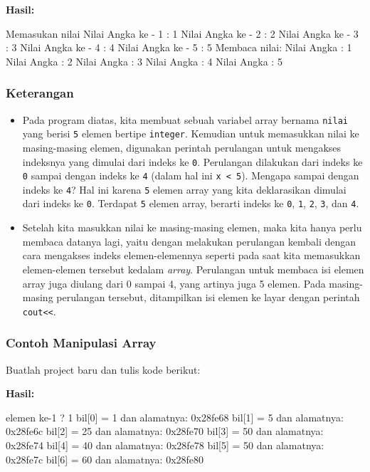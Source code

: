 \textbf{Hasil:}
\begin{lcverbatim}
Memasukan nilai
Nilai Angka ke - 1 : 1
Nilai Angka ke - 2 : 2
Nilai Angka ke - 3 : 3
Nilai Angka ke - 4 : 4
Nilai Angka ke - 5 : 5
Membaca nilai:
Nilai Angka : 1
Nilai Angka : 2
Nilai Angka : 3
Nilai Angka : 4
Nilai Angka : 5
\end{lcverbatim}

\subsubsection*{Keterangan}

\begin{itemize}
\item
 Pada program diatas, kita membuat sebuah variabel array bernama
 \texttt{nilai} yang berisi \texttt{5} elemen bertipe \texttt{integer}.
 Kemudian untuk memasukkan nilai ke masing-masing elemen, digunakan
 perintah perulangan untuk mengakses indeksnya yang dimulai dari indeks
 ke \texttt{0}. Perulangan dilakukan dari indeks ke \texttt{0} sampai
 dengan indeks ke \texttt{4} (dalam hal ini
 \texttt{x\ \textless{}\ 5}). Mengapa sampai dengan indeks ke
 \texttt{4}? Hal ini karena \texttt{5} elemen array yang kita
 deklarasikan dimulai dari indeks ke \texttt{0}. Terdapat \texttt{5}
 elemen array, berarti indeks ke \texttt{0}, \texttt{1}, \texttt{2},
 \texttt{3}, dan \texttt{4}.
\item
 Setelah kita masukkan nilai ke masing-masing elemen, maka kita hanya
 perlu membaca datanya lagi, yaitu dengan melakukan perulangan kembali
 dengan cara mengakses indeks elemen-elemennya seperti pada saat kita
 memasukkan elemen-elemen tersebut kedalam \emph{array}. Perulangan
 untuk membaca isi elemen array juga diulang dari 0 sampai 4, yang
 artinya juga 5 elemen. Pada masing-masing perulangan tersebut,
 ditampilkan isi elemen ke layar dengan perintah
 \texttt{cout\textless{}\textless{}}.
\end{itemize}

\subsubsection*{Contoh Manipulasi Array}

Buatlah project baru dan tulis kode berikut:




\textbf{Hasil:}

\begin{lcverbatim}
elemen ke-1 ? 1
bil[0] = 1 dan alamatnya: 0x28fe68
bil[1] = 5 dan alamatnya: 0x28fe6c
bil[2] = 25 dan alamatnya: 0x28fe70
bil[3] = 50 dan alamatnya: 0x28fe74
bil[4] = 40 dan alamatnya: 0x28fe78
bil[5] = 50 dan alamatnya: 0x28fe7c
bil[6] = 60 dan alamatnya: 0x28fe80
\end{lcverbatim}

